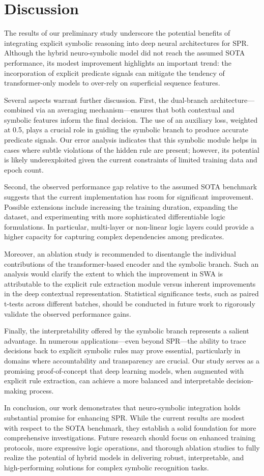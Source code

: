 \documentclass{article}
\begin{document}
\section{Discussion}
The results of our preliminary study underscore the potential benefits of integrating explicit symbolic reasoning into deep neural architectures for SPR. Although the hybrid neuro-symbolic model did not reach the assumed SOTA performance, its modest improvement highlights an important trend: the incorporation of explicit predicate signals can mitigate the tendency of transformer-only models to over-rely on superficial sequence features.

Several aspects warrant further discussion. First, the dual-branch architecture—combined via an averaging mechanism—ensures that both contextual and symbolic features inform the final decision. The use of an auxiliary loss, weighted at 0.5, plays a crucial role in guiding the symbolic branch to produce accurate predicate signals. Our error analysis indicates that this symbolic module helps in cases where subtle violations of the hidden rule are present; however, its potential is likely underexploited given the current constraints of limited training data and epoch count.

Second, the observed performance gap relative to the assumed SOTA benchmark suggests that the current implementation has room for significant improvement. Possible extensions include increasing the training duration, expanding the dataset, and experimenting with more sophisticated differentiable logic formulations. In particular, multi-layer or non-linear logic layers could provide a higher capacity for capturing complex dependencies among predicates.

Moreover, an ablation study is recommended to disentangle the individual contributions of the transformer-based encoder and the symbolic branch. Such an analysis would clarify the extent to which the improvement in SWA is attributable to the explicit rule extraction module versus inherent improvements in the deep contextual representation. Statistical significance tests, such as paired t-tests across different batches, should be conducted in future work to rigorously validate the observed performance gains.

Finally, the interpretability offered by the symbolic branch represents a salient advantage. In numerous applications—even beyond SPR—the ability to trace decisions back to explicit symbolic rules may prove essential, particularly in domains where accountability and transparency are crucial. Our study serves as a promising proof-of-concept that deep learning models, when augmented with explicit rule extraction, can achieve a more balanced and interpretable decision-making process.

In conclusion, our work demonstrates that neuro-symbolic integration holds substantial promise for enhancing SPR. While the current results are modest with respect to the SOTA benchmark, they establish a solid foundation for more comprehensive investigations. Future research should focus on enhanced training protocols, more expressive logic operations, and thorough ablation studies to fully realize the potential of hybrid models in delivering robust, interpretable, and high-performing solutions for complex symbolic recognition tasks.
\end{document}
